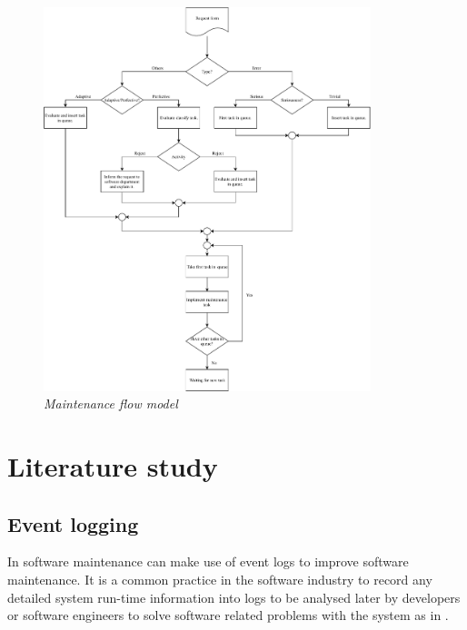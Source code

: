\begin{figure}[!htb] %
	\centering %
	\includegraphics[width=0.85\textwidth]{Images/Chapter1/Background/Maintenance_flow/Maintenance_Flow.pdf}
	\caption[Maintenance flow model]
	{\textit{Maintenance flow model \cite{Tang2010}}} \label{fig:CH1_MaintenanceFlow}
\end{figure}

\clearpage

\section{Literature study}

\subsection{Event logging}
In  software maintenance can make use of event logs to improve software maintenance. It is a common practice in the software industry to record any detailed system run-time information into logs to be analysed later by developers or software engineers to solve software related problems with the system as in  \cite{Zhu2019}.

